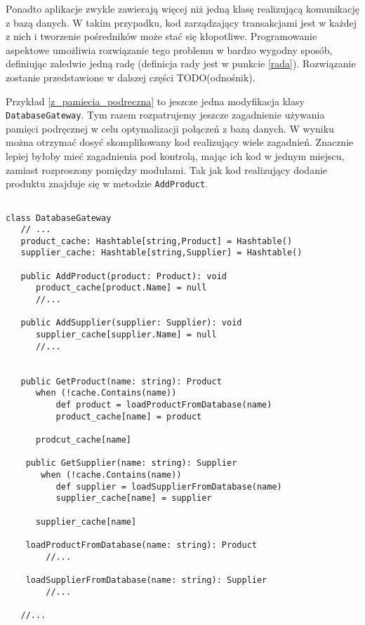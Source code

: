 \documentclass[a4paper,12pt]{mwbk}
\begin{document}
Ponadto aplikacje zwykle zawierają więcej niż jedną klasę realizującą
komunikację z bazą danych. W takim przypadku, kod zarządzający transakcjami
jest w każdej z nich i tworzenie pośredników może stać się kłopotliwe.
Programowanie aspektowe umożliwia rozwiązanie tego problemu w bardzo wygodny
sposób, definiując zaledwie jedną radę (definicja rady jest w punkcie
\ref{rada}). Rozwiązanie zostanie przedstawione w dalszej części
TODO(odnośnik).

Przykład \ref{z_pamiecia_podreczna} to jeszcze jedna modyfikacja klasy
\lstinline!DatabaseGateway!.  Tym razem rozpatrujemy jeszcze zagadnienie
używania pamięci podręcznej w celu optymalizacji połączeń z bazą danych. W
wyniku można otrzymać dosyć skomplikowany kod realizujący wiele zagadnień.
Znacznie lepiej byłoby mieć zagadnienia pod kontrolą, mając ich kod w jednym
miejscu, zamiast rozproszony pomiędzy modułami.  Tak jak kod realizujący
dodanie produktu znajduje się w metodzie \lstinline!AddProduct!.
         
\begin{lstlisting}[float,style=AspectJ,caption=Dwa zagadnienia przecinające, label=z_pamiecia_podreczna]

class DatabaseGateway
   // ...
   product_cache: Hashtable[string,Product] = Hashtable()
   supplier_cache: Hashtable[string,Supplier] = Hashtable()

   public AddProduct(product: Product): void
      product_cache[product.Name] = null
      //...

   public AddSupplier(supplier: Supplier): void
      supplier_cache[supplier.Name] = null
      //...
   

   public GetProduct(name: string): Product
      when (!cache.Contains(name))
          def product = loadProductFromDatabase(name)
          product_cache[name] = product

      prodcut_cache[name]

    public GetSupplier(name: string): Supplier
       when (!cache.Contains(name))
          def supplier = loadSupplierFromDatabase(name)
          supplier_cache[name] = supplier

      supplier_cache[name]

    loadProductFromDatabase(name: string): Product
        //...

    loadSupplierFromDatabase(name: string): Supplier
        //... 

   //...
\end{lstlisting}
	
\end{document}
